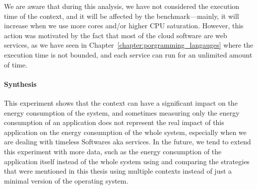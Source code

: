 We are aware that during this analysis, we have not considered the execution time of the context, and it will be affected by the benchmark---mainly, it will increase when we use more cores and/or higher CPU saturation.
However, this action was motivated by the fact that most of the cloud software are web services, as we have seen in Chapter~\ref{chapter:porgramming_langauges} where the execution time is not bounded, and each service can run for an unlimited amount of time.

\paragraph*{Synthesis}
This experiment shows that the context can have a significant impact on the energy consumption of the system, and sometimes measuring only the energy consumption of an application does not represent the real impact of this application on the energy consumption of the whole system, especially when we are dealing with timeless Softwares aka services. 
In the future, we tend to extend this experiment with more data, such as the energy consumption of the application itself instead of the whole system using \cite{fieni2020smartwatts} and comparing the strategies that were mentioned in this thesis using multiple contexts instead of just a minimal version of the operating system.





\vfill \strut  %
\cleardoublepage
